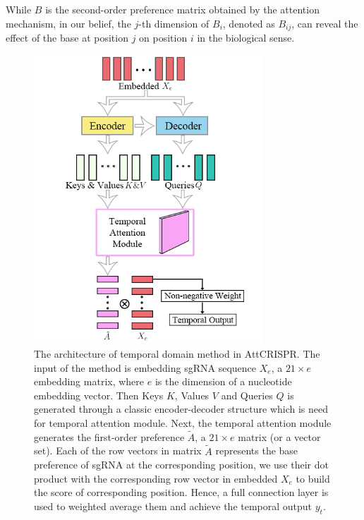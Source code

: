 \documentclass{bioinfo}
\begin{document}
While $B$ is the second-order preference matrix obtained by the attention mechanism, in our belief, the $j$-th dimension of $B_i$, denoted as $B_{ij}$, can reveal the effect of the base at position $j$ on position $i$ in the biological sense. 
\begin{figure}[!tpb]%
    \centerline{\includegraphics[width=86mm]{temporalmodule.png}}
    \caption{The architecture of temporal domain method in AttCRISPR. 
    The input of the method is embedding sgRNA sequence $X_e$, a $21\times e$ embedding matrix, where $e$ is the dimension of a nucleotide embedding vector. 
    Then Keys $K$, Values $V$ and Queries $Q$ is generated through a classic encoder-decoder structure which is need for temporal attention module.
    Next, the temporal attention module generates the first-order preference $\tilde{A}$, a $21\times e$ matrix (or a vector set). 
    Each of the row vectors in matrix $\tilde{A}$ represents the base preference of sgRNA at the corresponding position, we use their dot product with the corresponding row vector in embedded $X_e$ to build the score of corresponding position. 
    Hence, a full connection layer is used to weighted average them and achieve the temporal output $y_t$.
    }\label{fig:04}
\end{figure}
\end{document}
